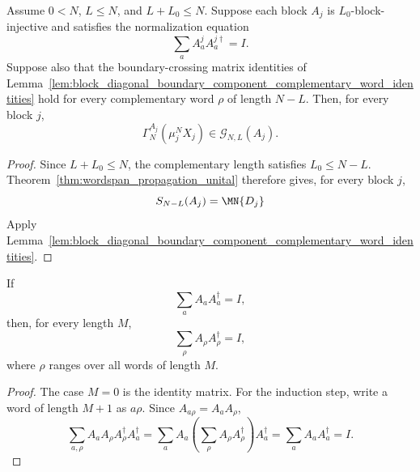 \begin{lemma}
    \label{lem:block_diagonal_boundary_component_complementary_word_identities_injective}
    \leanok
    Assume \(0<N\), \(L\le N\), and \(L+L_0\le N\). Suppose each block \(A_j\)
    is \(L_0\)-block-injective and satisfies the normalization equation
    \[
        \sum_a A^j_aA^{j\dagger}_a=I .
    \]
    Suppose also that the boundary-crossing matrix identities of
    Lemma~\ref{lem:block_diagonal_boundary_component_complementary_word_identities}
    hold for every complementary word \(\rho\) of length \(N-L\). Then, for
    every block \(j\),
    \[
        \Gamma_N^{A_j}(\mu_j^NX_j)\in\mathcal G_{N,L}(A_j).
    \]
\end{lemma}

\begin{proof}
    \leanok
    Since \(L+L_0\le N\), the complementary length satisfies \(L_0\le N-L\).
    Theorem~\ref{thm:wordspan_propagation_unital} therefore gives, for every
    block \(j\),
    \[
        S_{N-L}(A_j)=\MN{D_j}
    \]
    Apply
    Lemma~\ref{lem:block_diagonal_boundary_component_complementary_word_identities}.
\end{proof}

\begin{lemma}
    \label{lem:sum_evalWord_mul_conjTranspose_evalWord}
    \leanok
    \uses{}
    If
    \[
        \sum_a A_aA_a^\dagger=I ,
    \]
    then, for every length \(M\),
    \[
        \sum_\rho A_\rho A_\rho^\dagger=I ,
    \]
    where \(\rho\) ranges over all words of length \(M\).
\end{lemma}

\begin{proof}
    \leanok
    \uses{}
    The case \(M=0\) is the identity matrix.  For the induction step, write a
    word of length \(M+1\) as \(a\rho\).  Since \(A_{a\rho}=A_aA_\rho\),
    \[
        \sum_{a,\rho} A_aA_\rho A_\rho^\dagger A_a^\dagger
        =
        \sum_a A_a
        \left(\sum_\rho A_\rho A_\rho^\dagger\right)
        A_a^\dagger
        =
        \sum_a A_aA_a^\dagger
        =
        I .
    \]
\end{proof}

